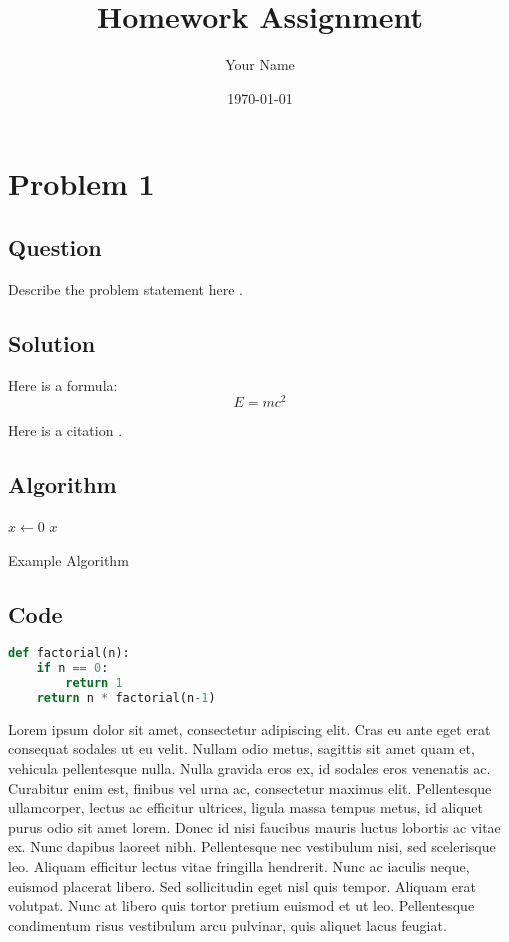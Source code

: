 \documentclass[a4paper,11pt]{article}
\title{Homework Assignment}
\author{Your Name}
\date{\today}
\begin{document}
\maketitle

\section*{Problem 1}
\subsection*{Question}
Describe the problem statement here \cite{qu2023towards}.

\subsection*{Solution}
Here is a formula:
\begin{equation}
    E = mc^2
\end{equation}

Here is a citation \cite{somebook}.

\subsection*{Algorithm}
\begin{algorithm}[H]
\DontPrintSemicolon
\SetAlgoLined
{}
$x \gets 0$\;
\Return $x$\;
\caption{Example Algorithm}
\end{algorithm}

\subsection*{Code}
\begin{lstlisting}[language=Python]
def factorial(n):
    if n == 0:
        return 1
    return n * factorial(n-1)
\end{lstlisting}



Lorem ipsum dolor sit amet, consectetur adipiscing elit. Cras eu ante
eget erat consequat sodales ut eu velit. Nullam odio metus, sagittis sit
 amet quam et, vehicula pellentesque nulla. Nulla gravida eros ex, id
sodales eros venenatis ac. Curabitur enim est, finibus vel urna ac,
consectetur maximus elit. Pellentesque ullamcorper, lectus ac efficitur
ultrices, ligula massa tempus metus, id aliquet purus odio sit amet
lorem. Donec id nisi faucibus mauris luctus lobortis ac vitae ex. Nunc
dapibus laoreet nibh. Pellentesque nec vestibulum nisi, sed scelerisque
leo. Aliquam efficitur lectus vitae fringilla hendrerit. Nunc ac iaculis
 neque, euismod placerat libero. Sed sollicitudin eget nisl quis tempor.
 Aliquam erat volutpat. Nunc at libero quis tortor pretium euismod et ut
 leo. Pellentesque condimentum risus vestibulum arcu pulvinar, quis
aliquet lacus feugiat.
\end{document}

